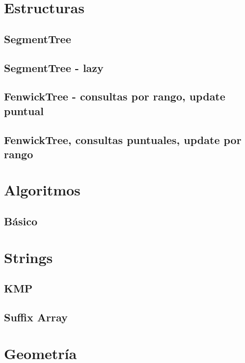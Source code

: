 \documentclass[10pt,landscape,twocolumn,a4paper,notitlepage]{article}
\begin{document}
\def\title{Calce Team}
\tableofcontents\newpage

\section{Estructuras}
\subsection{SegmentTree}

\subsection{SegmentTree - lazy}

\subsection{FenwickTree - consultas por rango, update puntual}


\subsection{FenwickTree, consultas puntuales, update por rango}


\section{Algoritmos}
\subsection{Básico}


\section{Strings}
\subsection{KMP}

\subsection{Suffix Array}



\section{Geometría}
\end{document}
